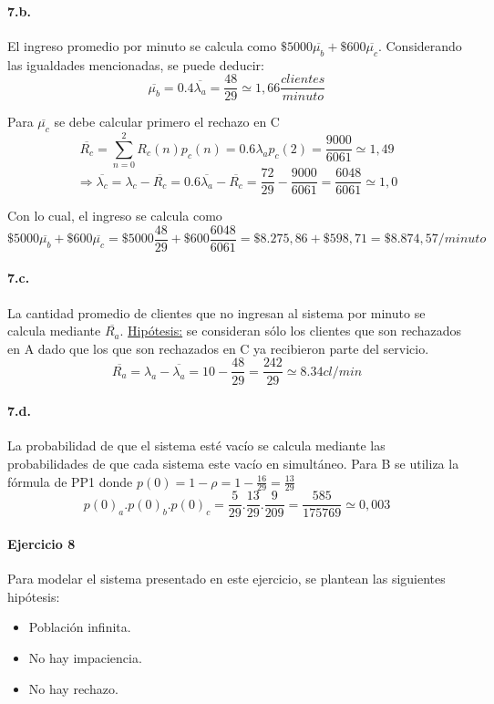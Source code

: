 \documentclass{article}
\begin{document}
  \paragraph{7.b.} El ingreso promedio por minuto se calcula como $\$5000 \overline{\mu_b} + \$600 \overline{\mu_c} $. Considerando las igualdades mencionadas, se puede deducir:
  $$ \overline{\mu_b} = 0.4\overline{\lambda_a} = \frac{48}{29} \simeq 1,66 \frac{clientes}{minuto}$$ 
  
  Para $\overline{\mu_c}$ se debe calcular primero el rechazo en C
  $$ \overline{R_c} = \sum_{n=0}^{2} R_c(n) p_c(n) = 0.6 \lambda_a p_c(2) =  \frac{9000}{6061} \simeq 1,49$$
  $$\Rightarrow \overline{\lambda_c} = \lambda_c -\overline{R_c} = 0.6\overline{\lambda_a} -\overline{R_c} = \frac{72}{29} - \frac{9000}{6061} = \frac{6048}{6061} \simeq 1,0$$
  
  Con lo cual, el ingreso se calcula como
  $$\$5000 \overline{\mu_b} + \$600 \overline{\mu_c} = \$5000 \frac{48}{29} + \$600 \frac{6048}{6061} = \$8.275,86 + \$598,71 = \$8.874,57 / minuto$$
  
  \paragraph{7.c.} La cantidad promedio de clientes que no ingresan al sistema por minuto se calcula mediante $\overline{R_a}$. 
  \underline{Hipótesis:} se consideran sólo los clientes que son rechazados en A dado que los que son rechazados en C ya recibieron parte del servicio.
  $$\overline{R_a} = \lambda_a -\overline{\lambda_a} = 10 - \frac{48}{29} = \frac{242}{29} \simeq 8.34 cl/min$$
  
  \paragraph{7.d.} La probabilidad de que el sistema esté vacío se calcula mediante las probabilidades de que cada sistema este vacío en simultáneo. 
  Para B se utiliza la fórmula de PP1 donde $p(0) = 1-\rho = 1- \frac{16}{29} = \frac{13}{29} $
  $$ p(0)_a . p(0)_b . p(0)_c = \frac{5}{29} .\frac{13}{29} . \frac{9}{209} = \frac{585}{175769} \simeq 0,003 $$

\paragraph{Ejercicio 8}
   Para modelar el sistema presentado en este ejercicio, se plantean las siguientes hipótesis:

   \begin{itemize}
      \item Población infinita.
      \item No hay impaciencia.
      \item No hay rechazo.
   \end{itemize}
\end{document}
